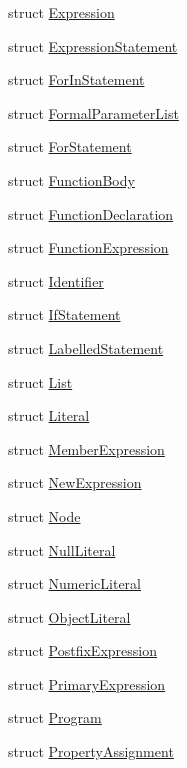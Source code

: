 \begin{DoxyCompactItemize}
\item 
struct \hyperlink{structast_1_1_expression}{Expression}
\item 
struct \hyperlink{structast_1_1_expression_statement}{Expression\+Statement}
\item 
struct \hyperlink{structast_1_1_for_in_statement}{For\+In\+Statement}
\item 
struct \hyperlink{structast_1_1_formal_parameter_list}{Formal\+Parameter\+List}
\item 
struct \hyperlink{structast_1_1_for_statement}{For\+Statement}
\item 
struct \hyperlink{structast_1_1_function_body}{Function\+Body}
\item 
struct \hyperlink{structast_1_1_function_declaration}{Function\+Declaration}
\item 
struct \hyperlink{structast_1_1_function_expression}{Function\+Expression}
\item 
struct \hyperlink{structast_1_1_identifier}{Identifier}
\item 
struct \hyperlink{structast_1_1_if_statement}{If\+Statement}
\item 
struct \hyperlink{structast_1_1_labelled_statement}{Labelled\+Statement}
\item 
struct \hyperlink{structast_1_1_list}{List}
\item 
struct \hyperlink{structast_1_1_literal}{Literal}
\item 
struct \hyperlink{structast_1_1_member_expression}{Member\+Expression}
\item 
struct \hyperlink{structast_1_1_new_expression}{New\+Expression}
\item 
struct \hyperlink{structast_1_1_node}{Node}
\item 
struct \hyperlink{structast_1_1_null_literal}{Null\+Literal}
\item 
struct \hyperlink{structast_1_1_numeric_literal}{Numeric\+Literal}
\item 
struct \hyperlink{structast_1_1_object_literal}{Object\+Literal}
\item 
struct \hyperlink{structast_1_1_postfix_expression}{Postfix\+Expression}
\item 
struct \hyperlink{structast_1_1_primary_expression}{Primary\+Expression}
\item 
struct \hyperlink{structast_1_1_program}{Program}
\item 
struct \hyperlink{structast_1_1_property_assignment}{Property\+Assignment}
\item 

\end{DoxyCompactItemize}
